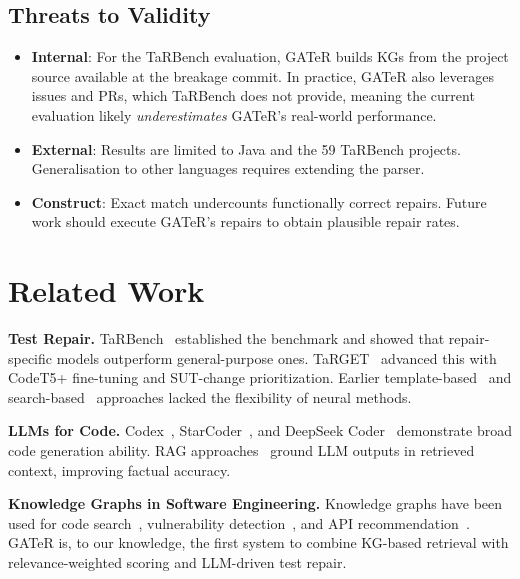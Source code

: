 \documentclass[conference,10pt]{IEEEtran}
\begin{document}
\subsection{Threats to Validity}

\begin{itemize}
    \item \textbf{Internal}: For the TaRBench evaluation, GATeR builds
          KGs from the project source available at the breakage commit.
          In practice, GATeR also leverages issues and PRs, which TaRBench
          does not provide, meaning the current evaluation likely
          \emph{underestimates} GATeR's real-world performance.
    \item \textbf{External}: Results are limited to Java and the 59
          TaRBench projects. Generalisation to other languages requires
          extending the parser.
    \item \textbf{Construct}: Exact match undercounts functionally correct
          repairs. Future work should execute GATeR's repairs to obtain
          plausible repair rates.
\end{itemize}

\section{Related Work}
\label{sec:related}

\textbf{Test Repair.}
TaRBench~\cite{tarbench2023} established the benchmark and showed that
repair-specific models outperform general-purpose ones. TaRGET~\cite{target2024}
advanced this with CodeT5+ fine-tuning and SUT-change prioritization.
Earlier template-based~\cite{mirzaaghaei2014} and
search-based~\cite{daniel2010} approaches lacked the flexibility of
neural methods.

\textbf{LLMs for Code.}
Codex~\cite{chen2021codex}, StarCoder~\cite{li2023starcoder}, and
DeepSeek Coder~\cite{deepseek2024} demonstrate broad code generation
ability. RAG approaches~\cite{lewis2020rag,zhang2023repocoder} ground
LLM outputs in retrieved context, improving factual accuracy.

\textbf{Knowledge Graphs in Software Engineering.}
Knowledge graphs have been used for code search~\cite{gu2018deep},
vulnerability detection~\cite{zhou2019devign}, and API
recommendation~\cite{huang2018api}. GATeR is, to our knowledge, the
first system to combine KG-based retrieval with relevance-weighted scoring
and LLM-driven test repair.
\end{document}
